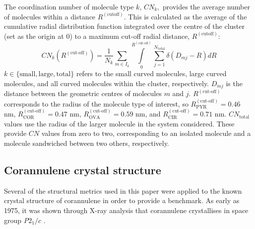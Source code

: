 The coordination number of molecule type $k$, $CN_{k},$ provides the average number of molecules within a distance $R^{(\text{cutoff})}$. This is calculated as the average of the cumulative radial distribution function integrated over the centre of the cluster (set as the origin at 0) to a maximum cut-off radial distance, $R^{(\text{cutoff})}$:
\begin{equation}
    CN_{k}(R^{(\text{cut-off})}) = \frac{1}{N_{k}} \sum_{m \in I_{k}} \int\limits_{0}^{R^{(\text{cut-off})}}  \sum_{j=1}^{N_{\text{total}}} \delta(D_{mj} - R) dR
\end{equation}
$k \in \{\text{small}, \text{large}, \text{total}\}$ refers to the small curved molecules, large curved molecules, and all curved molecules within the cluster, respectively. $D_{mj}$ is the distance between the geometric centres of molecules $m$ and $j$. $R^{(\text{cut-off})}$ corresponds to the radius of the molecule type of interest, so $R^{(\text{cut-off})}_{\text{PYR}} = 0.46$ nm, $R^{(\text{cut-off})}_{\text{COR}} = 0.47$ nm, $R^{(\text{cut-off})}_{\text{OVA}} = 0.59$ nm, and $R^{(\text{cut-off})}_{\text{CIR}} = 0.71$ nm. $CN_{\text{total}}$ values use the radius of the larger molecule in the system considered. These provide $CN$ values from zero to two, corresponding to an isolated molecule and a molecule sandwiched between two others, respectively.




\subsection{Corannulene crystal structure}
\label{secSI:corannulenecrystal}
Several of the structural metrics used in this paper were applied to the known crystal structure of corannulene in order to provide a benchmark. 
As early as 1975, it was shown through X-ray analysis that corannulene crystallises in space group \textit{P}$2_{1}/c$ \cite{hanson1976crystal}.

